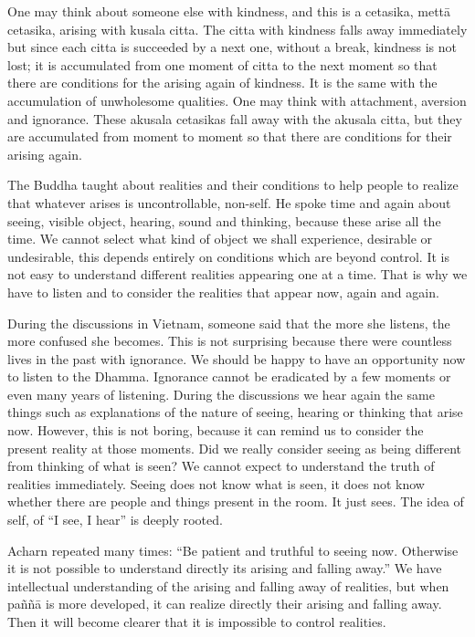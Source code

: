 One may think about someone else with kindness, and this is a cetasika,
mettā cetasika, arising with kusala citta. The citta with kindness falls
away immediately but since each citta is succeeded by a next one,
without a break, kindness is not lost; it is accumulated from one moment
of citta to the next moment so that there are conditions for the arising
again of kindness. It is the same with the accumulation of unwholesome
qualities. One may think with attachment, aversion and ignorance. These
akusala cetasikas fall away with the akusala citta, but they are
accumulated from moment to moment so that there are conditions for their
arising again.

The Buddha taught about realities and their conditions to help people to
realize that whatever arises is uncontrollable, non-self. He spoke time
and again about seeing, visible object, hearing, sound and thinking,
because these arise all the time. We cannot select what kind of object
we shall experience, desirable or undesirable, this depends entirely on
conditions which are beyond control. It is not easy to understand
different realities appearing one at a time. That is why we have to
listen and to consider the realities that appear now, again and again.

During the discussions in Vietnam, someone said that the more she
listens, the more confused she becomes. This is not surprising because
there were countless lives in the past with ignorance. We should be
happy to have an opportunity now to listen to the Dhamma. Ignorance
cannot be eradicated by a few moments or even many years of listening.
During the discussions we hear again the same things such as
explanations of the nature of seeing, hearing or thinking that arise
now. However, this is not boring, because it can remind us to consider
the present reality at those moments. Did we really consider seeing as
being different from thinking of what is seen? We cannot expect to
understand the truth of realities immediately. Seeing does not know what
is seen, it does not know whether there are people and things present in
the room. It just sees. The idea of self, of ``I see, I hear'' is deeply
rooted.

Acharn repeated many times: ``Be patient and truthful to seeing now.
Otherwise it is not possible to understand directly its arising and
falling away.'' We have intellectual understanding of the arising and
falling away of realities, but when paññā is more developed, it can
realize directly their arising and falling away. Then it will become
clearer that it is impossible to control realities.

